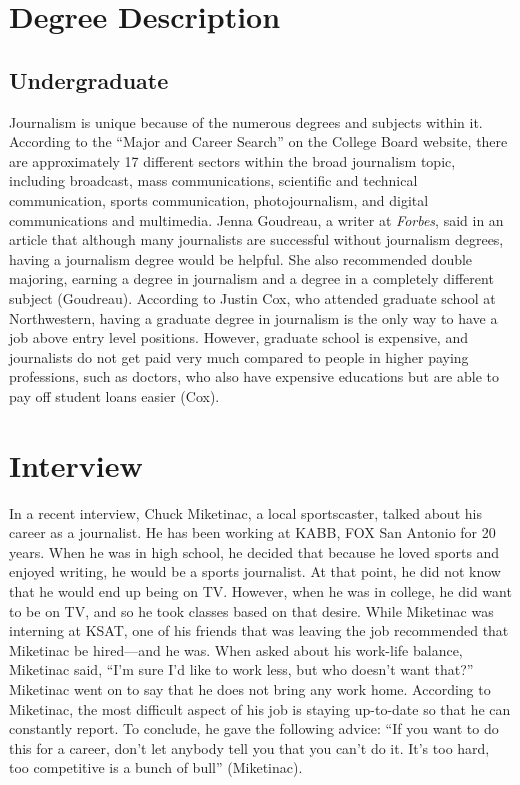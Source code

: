 \begin{multicols}{2}

\section{Degree Description}
    \subsection{Undergraduate}
Journalism is unique because of the numerous degrees and subjects within it. According to the “Major and Career Search” on the College Board website, there are approximately 17 different sectors within the broad journalism topic, including broadcast, mass communications, scientific and technical communication, sports communication, photojournalism, and digital communications and multimedia. Jenna Goudreau, a writer at \textit{Forbes}, said in an article that although many journalists are successful without journalism degrees, having a journalism degree would be helpful. She also recommended double majoring, earning a degree in journalism and a degree in a completely different subject (Goudreau). According to Justin Cox, who attended graduate school at Northwestern, having a graduate degree in journalism is the only way to have a job above entry level positions. However, graduate school is expensive, and journalists do not get paid very much compared to people in higher paying professions, such as doctors, who also have expensive educations but are able to pay off student loans easier (Cox). 
\section{Interview}
    In a recent interview, Chuck Miketinac, a local sportscaster, talked about his career as a journalist. He has been working at KABB, FOX San Antonio for 20 years. When he was in high school, he decided that because he loved sports and enjoyed writing, he would be a sports journalist. At that point, he did not know that he would end up being on TV. However, when he was in college, he did want to be on TV, and so he took classes based on that desire. While Miketinac was interning at KSAT, one of his friends that was leaving the job recommended that Miketinac be hired—and he was. When asked about his work-life balance, Miketinac said, “I'm sure I'd like to work less, but who doesn't want that?” Miketinac went on to say that he does not bring any work home. According to Miketinac, the most difficult aspect of his job is staying up-to-date so that he can constantly report. To conclude, he gave the following advice: “If you want to do this for a career, don't let anybody tell you that you can't do it. It's too hard, too competitive is a bunch of bull” (Miketinac).

\end{multicols}
